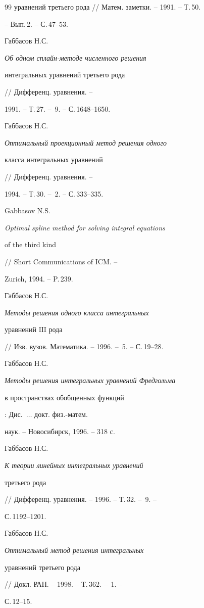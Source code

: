 \begin{thebibliography}{99}
{уравнений третьего рода} // Матем. заметки. -- 1991. -- Т.\,50. 


-- Вып.\,2. -- С.\,47--53. 




Габбасов Н.С. {\em Об одном сплайн-методе численного решения 


интегральных уравнений третьего рода} // Дифференц. уравнения. -- 


1991. -- Т.\,27. -- \No\,9. -- С.\,1648--1650. 




Габбасов Н.С. {\em Оптимальный проекционный метод решения одного 


класса интегральных уравнений} // Дифференц. уравнения. -- 


1994. -- Т.\,30. -- \No\,2. -- С.\,333--335. 




Gabbasov N.S. {\em Optimal spline method for solving integral equations 


of the third kind} // Short Communications of ICM. -- 


Zurich, 1994. -- P.\,239. 




Габбасов Н.С. {\em Методы решения одного класса интегральных 


уравнений $\mathrm{III}$ рода} 


// Изв. вузов. Математика. -- 1996. -- \No\,5. -- С.\,19--28. 




Габбасов Н.С. {\em Методы решения интегральных уравнений Фредгольма 


в пространствах обобщенных функций}: Дис.~$\dotsc$ докт. физ.-матем. 


наук. -- Новосибирск, 1996. -- 318 с. 




Габбасов Н.С. {\em К теории линейных интегральных уравнений 


третьего рода} // Дифференц. уравнения. -- 1996. -- Т.\,32. -- \No\,9. -- 


С.\,1192--1201. 




Габбасов Н.С. {\em Оптимальный метод решения интегральных 


уравнений третьего рода} // Докл. РАН. -- 1998. -- Т.\,362. -- \No\,1. -- 


С.\,12--15. 





\end{thebibliography}
